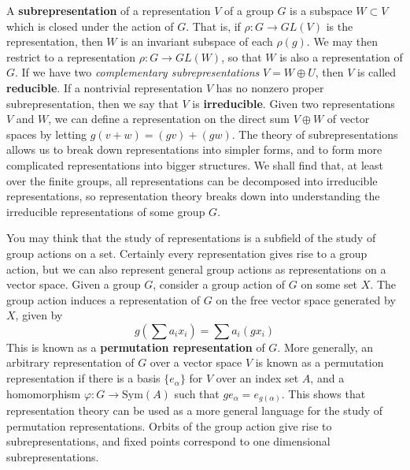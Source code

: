 A {\bf subrepresentation} of a representation $V$ of a group $G$ is a subspace $W \subset V$ which is closed under the action of $G$. That is, if $\rho:G \to GL(V)$ is the representation, then $W$ is an invariant subspace of each $\rho(g)$. We may then restrict to a representation $\rho: G \to GL(W)$, so that $W$ is also a representation of $G$. If we have two {\it complementary subrepresentations} $V = W \oplus U$, then $V$ is called {\bf reducible}. If a nontrivial representation $V$ has no nonzero proper subrepresentation, then we say that $V$ is {\bf irreducible}. Given two representations $V$ and $W$, we can define a representation on the direct sum $V \oplus W$ of vector spaces by letting $g(v + w) = (gv) + (gw)$. The theory of subrepresentations allows us to break down representations into simpler forms, and to form more complicated representations into bigger structures. We shall find that, at least over the finite groups, all representations can be decomposed into irreducible representations, so representation theory breaks down into understanding the irreducible representations of some group $G$.

\begin{example}
    You may think that the study of representations is a subfield of the study of group actions on a set. Certainly every representation gives rise to a group action, but we can also represent general group actions as representations on a vector space. Given a group $G$, consider a group action of $G$ on some set $X$. The group action induces a representation of $G$ on the free vector space generated by $X$, given by
    \[ g \left( \sum a_i x_i \right) = \sum a_i (gx_i) \]
    This is known as a {\bf permutation representation} of $G$. More generally, an arbitrary representation of $G$ over a vector space $V$ is known as a permutation representation if there is a basis $\{ e_\alpha \}$ for $V$ over an index set $A$, and a homomorphism $\varphi: G \to \text{Sym}(A)$ such that $ge_\alpha = e_{g(\alpha)}$. This shows that representation theory can be used as a more general language for the study of permutation representations. Orbits of the group action give rise to subrepresentations, and fixed points correspond to one dimensional subrepresentations.
\end{example}

